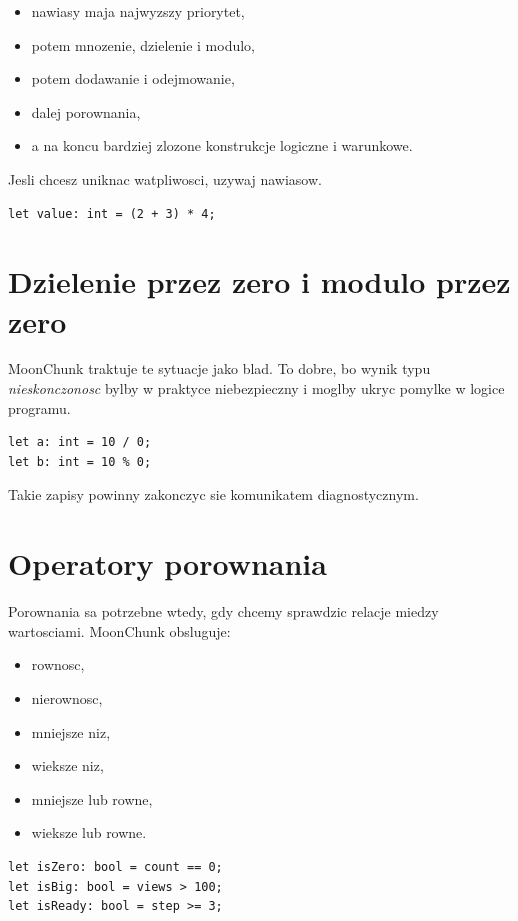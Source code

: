 \begin{itemize}
  \item nawiasy maja najwyzszy priorytet,
  \item potem mnozenie, dzielenie i modulo,
  \item potem dodawanie i odejmowanie,
  \item dalej porownania,
  \item a na koncu bardziej zlozone konstrukcje logiczne i warunkowe.
\end{itemize}

Jesli chcesz uniknac watpliwosci, uzywaj nawiasow.

\begin{lstlisting}[style=moonchunk,caption={Nawiasy zwiekszaja czytelnosc}]
let value: int = (2 + 3) * 4;
\end{lstlisting}

\section{Dzielenie przez zero i modulo przez zero}
MoonChunk traktuje te sytuacje jako blad. To dobre, bo wynik typu \emph{nieskonczonosc}
bylby w praktyce niebezpieczny i moglby ukryc pomylke w logice programu.

\begin{lstlisting}[style=moonchunk,caption={Przyklady niedozwolonych operacji}]
let a: int = 10 / 0;
let b: int = 10 % 0;
\end{lstlisting}

Takie zapisy powinny zakonczyc sie komunikatem diagnostycznym.

\section{Operatory porownania}
Porownania sa potrzebne wtedy, gdy chcemy sprawdzic relacje miedzy wartosciami.
MoonChunk obsluguje:

\begin{itemize}
  \item \mc{==} rownosc,
  \item \mc{!=} nierownosc,
  \item \mc{<} mniejsze niz,
  \item \mc{>} wieksze niz,
  \item \mc{<=} mniejsze lub rowne,
  \item \mc{>=} wieksze lub rowne.
\end{itemize}

\begin{lstlisting}[style=moonchunk,caption={Porownania w praktyce}]
let isZero: bool = count == 0;
let isBig: bool = views > 100;
let isReady: bool = step >= 3;
\end{lstlisting}

